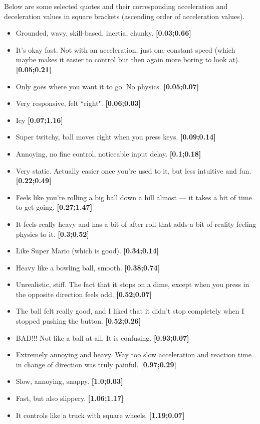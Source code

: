 Below are some selected quotes and their corresponding acceleration and deceleration values in square brackets (ascending order of acceleration values).
\begin{itemize}[noitemsep,nolistsep]
\item Grounded, wavy, skill-based, inertia, chunky. \textbf{[0.03;0.66]}
\item It's okay fast. Not with an acceleration, just one constant speed (which maybe makes it easier to control but then again more boring to look at). \textbf{[0.05;0.21]}
\item Only goes where you want it to go. No physics. \textbf{[0.05;0.07]}
\item Very responsive, felt ``right". \textbf{[0.06;0.03]}
\item Icy \textbf{[0.07;1.16]}
\item Super twitchy, ball moves right when you press keys. \textbf{[0.09;0.14]}
\item Annoying, no fine control, noticeable input delay. \textbf{[0.1;0.18]}
\item Very static. Actually easier once you're used to it, but less intuitive and fun. \textbf{[0.22;0.49]}
\item Feels like you're rolling a big ball down a hill almost --- it takes a bit of time to get going. \textbf{[0.27;1.47]}
\item It feels really heavy and has a bit of after roll that adds a bit of reality feeling physics to it. \textbf{[0.3;0.52]}
\item Like Super Mario (which is good). \textbf{[0.34;0.14]}
\item Heavy like a bowling ball, smooth. \textbf{[0.38;0.74]}
\item Unrealistic, stiff. The fact that it stops on a dime, except when you press in the opposite direction feels odd. \textbf{[0.52;0.07]}
\item The ball felt really good, and I liked that it didn't stop completely when I stopped pushing the button. \textbf{[0.52;0.26]}
\item BAD!!! Not like a ball at all. It is confusing. \textbf{[0.93;0.07]}
\item Extremely annoying and heavy. Way too slow acceleration and reaction time in change of direction was truly painful. \textbf{[0.97;0.29]}
\item Slow, annoying, snappy. \textbf{[1.0;0.03]}
\item Fast, but also slippery. \textbf{[1.06;1.17]}
\item It controls like a truck with square wheels. \textbf{[1.19;0.07]}

\end{itemize}
